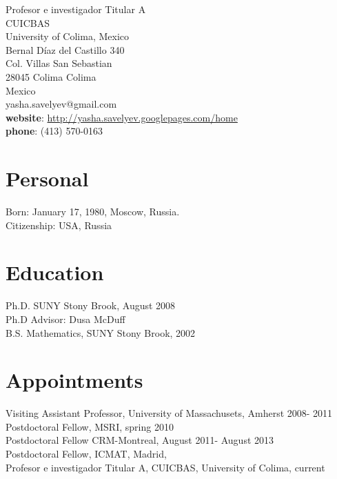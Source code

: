 \documentclass[overlapped,line,letterpaper]{res}
\begin{document}

\setlength{\leftmargini}{0em}
\renewcommand{\labelitemi}{}

\renewcommand{\namefont}{\large\textbf}
 

\begin{resume}
\begin{ncolumn}{2}
Profesor e investigador Titular A \\
CUICBAS \\
University of Colima, Mexico \\
Bernal Díaz del Castillo 340 \\
Col. Villas San Sebastian \\
28045 Colima Colima \\
Mexico \\

yasha.savelyev@gmail.com \\
\textbf{website}: \href{https://sites.google.com/site/yashasavelyev/home} 
{http://yasha.savelyev.googlepages.com/home}\\ \textbf {phone}:
(413) 570-0163\\
\end{ncolumn}
  
 \section {\sc Personal}
  Born: January 17, 1980, Moscow, Russia. \\
 {Citizenship: USA, Russia}
\section{\sc Education}
Ph.D. SUNY Stony Brook, August 2008  \\
Ph.D Advisor: Dusa McDuff\\
B.S. Mathematics, SUNY Stony Brook, 2002\\ 
\section {\sc Appointments}
Visiting Assistant Professor, University of Massachusets, Amherst 2008-
2011 \\ Postdoctoral Fellow, MSRI, spring 2010\\
Postdoctoral Fellow CRM-Montreal, August 2011- August 2013\\
Postdoctoral Fellow, ICMAT, Madrid,  \\
Profesor e investigador Titular A, CUICBAS, University of Colima, current \\

\end{resume}
\end{document}
